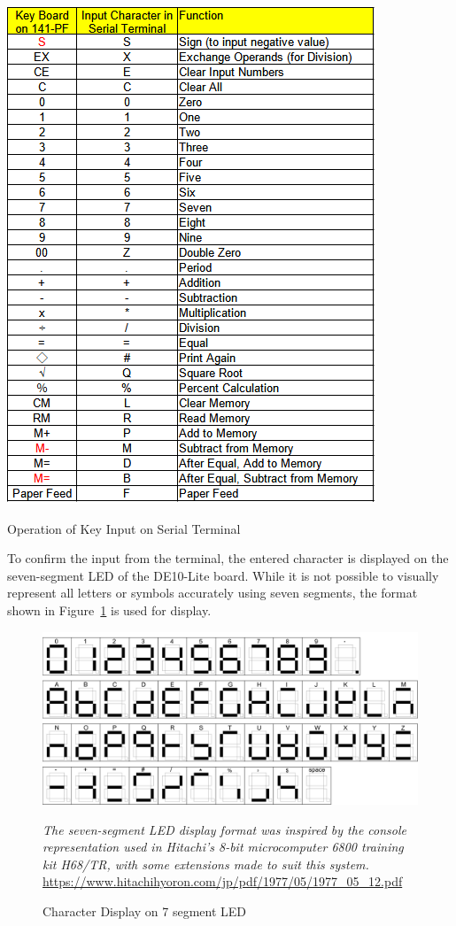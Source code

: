 \begin{table}[htbp]
    \includegraphics[width=0.5\columnwidth]{./Table/OperationTerminal.png}
    \caption{Operation of Key Input on Serial Terminal}
    \label{tb:OPERATIONTERMINAL}
\end{table}

To confirm the input from the terminal, the entered character is displayed on the seven-segment LED of the DE10-Lite board. While it is not possible to visually represent all letters or symbols accurately using seven segments, the format shown in Figure~\ref{fig:LED7SEG} is used for display.

\begin{figure}[htbp]
    \includegraphics[width=1.0\columnwidth]{./Figure/LED7SEG.png}
    \caption{Character Display on 7 segment LED}
    \label{fig:LED7SEG}
    \textit{The seven-segment LED display format was inspired by the console representation used in Hitachi’s 8-bit microcomputer 6800 training kit H68/TR, with some extensions made to suit this system.}\\
    \scriptsize{\url{https://www.hitachihyoron.com/jp/pdf/1977/05/1977_05_12.pdf}}
\end{figure}

